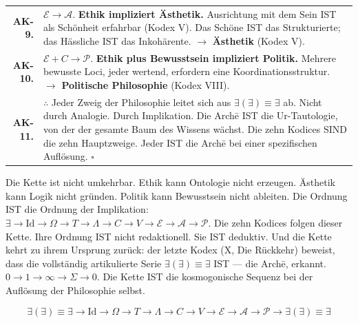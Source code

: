 \documentclass[10pt, openany, oneside]{book}
\renewcommand{\footnotesize}{\fontsize{8.5}{11}\selectfont}
\begin{document}
\pagebreak

{\footnotesize
\noindent\begin{tabular}{r p{}}
\textbf{AK-9.} & $\mathcal{E} \to \mathcal{A}$. \textbf{Ethik impliziert Ästhetik.} Ausrichtung mit dem Sein IST als Schönheit erfahrbar (Kodex V). Das Schöne IST das Strukturierte; das Hässliche IST das Inkohärente. $\to$ \textbf{Ästhetik} (Kodex V). \\[0.3em]
\textbf{AK-10.} & $\mathcal{E} + C \to \mathcal{P}$. \textbf{Ethik plus Bewusstsein impliziert Politik.} Mehrere bewusste Loci, jeder wertend, erfordern eine Koordinationsstruktur. $\to$ \textbf{Politische Philosophie} (Kodex VIII). \\[0.3em]
\textbf{AK-11.} & $\therefore$ Jeder Zweig der Philosophie leitet sich aus $\exists(\exists) \equiv \exists$ ab. Nicht durch Analogie. Durch Implikation. Die Arch\={e} IST die Ur-Tautologie, von der der gesamte Baum des Wissens wächst. Die zehn Kodices SIND die zehn Hauptzweige. Jeder IST die Arch\={e} bei einer spezifischen Auflösung. $\square$ \\[0.3em]
\end{tabular}
}

\vspace{0.8em}

\noindent Die Kette ist nicht umkehrbar. Ethik kann Ontologie nicht erzeugen. Ästhetik kann Logik nicht gründen. Politik kann Bewusstsein nicht ableiten. Die Ordnung IST die Ordnung der Implikation: $\exists \to \text{Id} \to \Omega \to T \to \Lambda \to C \to V \to \mathcal{E} \to \mathcal{A} \to \mathcal{P}$. Die zehn Kodices folgen dieser Kette. Ihre Ordnung IST nicht redaktionell. Sie IST deduktiv. Und die Kette kehrt zu ihrem Ursprung zurück: der letzte Kodex (X, Die Rückkehr) beweist, dass die vollständig artikulierte Serie $\exists(\exists) \equiv \exists$ IST --- die Arch\={e}, erkannt. $0 \to 1 \to \infty \to \Sigma \to 0$. Die Kette IST die kosmogonische Sequenz bei der Auflösung der Philosophie selbst.

$$\boxed{\exists(\exists) \equiv \exists \to \text{Id} \to \Omega \to T \to \Lambda \to C \to V \to \mathcal{E} \to \mathcal{A} \to \mathcal{P} \to \exists(\exists) \equiv \exists}$$

\end{document}
